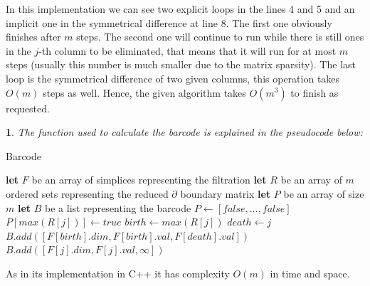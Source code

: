 \documentclass[10pt]{article} %
\theoremstyle{problemstyle}
\newtheorem{question}{\arabic{question}}
\begin{document}
In this implementation we can see two explicit loops in the lines 4 and 5 and an implicit one in the symmetrical difference at line 8. The first one obviously finishes after $m$ steps. The second one will continue to run while there is still ones in the $j$-th column to be eliminated, that means that it will run for at most $m$ steps (usually this number is much smaller due to the matrix sparsity). The last loop is the symmetrical difference of two given columns, this operation takes $O(m)$ steps as well. Hence, the given algorithm takes $O(m^3)$ to finish as requested.
\begin{question} %

The function used to calculate the barcode is explained in the pseudocode below:
\end{question}

\begin{algorithm}[H]
\caption{Barcode}
\begin{algorithmic}[1]
\State \textbf{let} $F$ be an array of simplices representing the filtration
\State \textbf{let} $R$ be an array of $m$ ordered sets representing the reduced $\partial$ boundary matrix
\State \textbf{let} $P$ be an array of size $m$
\State \textbf{let} $B$ be a list representing the barcode
\State $P \gets [false,\dots,false]$
		\State $P[max(R[j])] \gets true$ 
	\EndIf
\EndFor
{}
	    \State $birth \gets max(R[j])$
	    \State $death \gets j$
		\State $B.add([F[birth].dim, F[birth].val, F[death].val])$
	\Else
    		\State $B.add([F[j].dim, F[j].val, \infty])$
    	\EndIf
	\EndIf
\EndFor
\end{algorithmic}
\end{algorithm}
As in its implementation in C++ it has complexity $O(m)$ in time and space.
\end{document}
